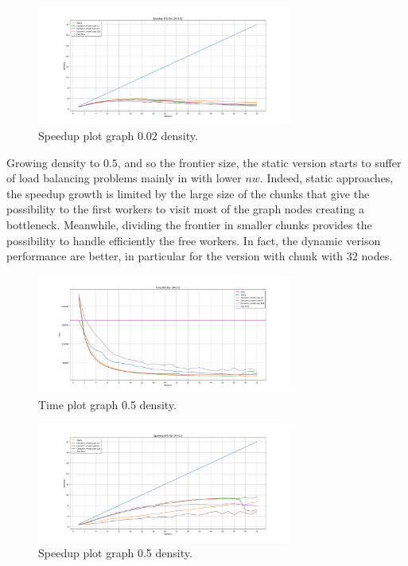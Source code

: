 \begin{figure}[htb!]
    \centering
    \includegraphics[width=0.75\textwidth]{Figures/plot_map_speedup_vs10K002.png}
    \caption{Speedup plot graph 0.02 density.}
    \label{fig:plot_speedup_10k_002}
\end{figure}
\FloatBarrier
Growing density to $0.5$, and so the frontier size, the static version starts to suffer of load balancing problems mainly in with lower $nw$. Indeed, static approaches, the speedup growth is limited by the large size of the chunks that give the possibility to the first workers to visit most of the graph nodes creating a bottleneck. Meanwhile, dividing the frontier in smaller chunks provides the possibility to handle efficiently the free workers. In fact, the dynamic verison performance are better, in particular for the version with chunk with $32$ nodes.

\begin{figure}[htb!]
    \centering
    \includegraphics[width=0.75\textwidth]{Figures/plot_map_time_vs10K05.png}
    \caption{Time plot graph 0.5 density.}
    \label{fig:plot_time_10k_05}
\end{figure}
\FloatBarrier

\begin{figure}[htb!]
    \centering
    \includegraphics[width=0.75\textwidth]{Figures/plot_map_speedup_vs10K05.png}
    \caption{Speedup plot graph 0.5 density.}
    \label{fig:plot_speedup_10k_05}
\end{figure}
\FloatBarrier

